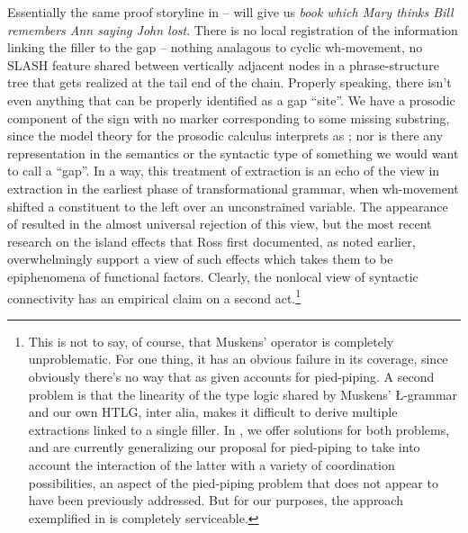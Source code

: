 \documentclass[output=paper,colorlinks,citecolor=brown]{langscibook}
\begin{document}
\begin{exe}
 \ex\label{length}
\end{exe}
Essentially the same proof storyline in --
will give us \textit{book which Mary thinks Bill remembers Ann saying
John lost}. There is no local registration of the information linking
the filler to the gap -- nothing analagous to cyclic wh-movement, no
SLASH feature shared between vertically adjacent nodes in a
phrase-structure tree that gets realized at the tail end of the
chain. Properly speaking, there isn't even anything that can be
properly identified as a gap ``site''. We have a prosodic component of
the sign with no marker corresponding to some missing substring, since
the model theory for the prosodic calculus interprets  as
; nor is there any representation in the semantics or the
syntactic type of something we would want to call a ``gap''. In a way,
this treatment of extraction is an echo of the view in extraction in
the earliest phase of transformational grammar, when wh-movement
shifted a constituent to the left over an unconstrained variable. The
appearance of \citet{ross67} resulted in the almost universal rejection of
this view, but the most recent research on the island effects that
Ross first documented, as noted earlier, overwhelmingly support a view
of such effects which takes them to be epiphenomena of functional
factors. Clearly, the nonlocal view of syntactic connectivity has an
empirical claim on a second act.\footnote{This is not to say, of
course, that Muskens' operator is completely unproblematic. For one
thing, it has an obvious failure in its coverage, since obviously
there's no way that  as given accounts for pied-piping. A
second problem is that the linearity of the type logic shared by
Muskens' \L-grammar and our own HTLG, inter alia, makes it difficult
to derive multiple extractions linked to a single filler. In \citet{kubotalevineBook},
we offer solutions for both problems, and are currently generalizing
our proposal for pied-piping to take into account the interaction of
the latter with a variety of coordination possibilities, an aspect of
the pied-piping problem that does not appear to have been previously
addressed. But for our purposes, the approach exemplified in 
is completely serviceable.}
\end{document}

